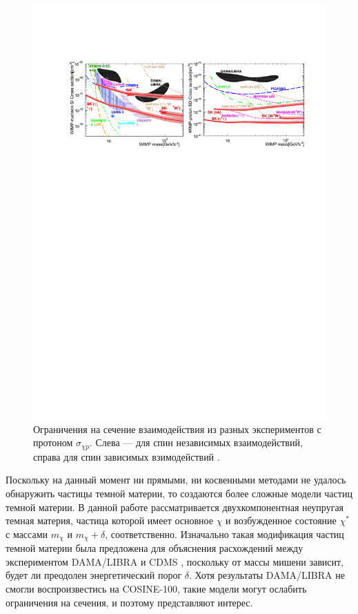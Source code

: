 \begin{figure}[htb]
	\begin{center}
		\includegraphics[scale=0.9]{images/SK_graphs.pdf}
		\caption{Ограничения на сечение взаимодействия из разных экспериментов с протоном $\sigma_{\chi p}$. Слева --- для спин независимых взаимодействий, справа для спин зависимых взимодействий \cite{kamiokandecollaboration2015search}.}
	\end{center}
\end{figure}

Поскольку на данный момент ни прямыми, ни косвенными методами не удалось обнаружить частицы темной материи, то создаются более сложные модели частиц темной материи.
В данной работе рассматривается двухкомпонентная неупругая темная материя, частица которой имеет основное $\chi$ и возбужденное состояние $\chi^*$ с массами $m_{\chi}$ и $m_{\chi}+\delta$, соответственно. Изначально такая модификация частиц темной материи была предложена для объяснения расхождений между экспериментом DAMA/LIBRA и CDMS \cite{PhysRevD.64.043502}, поскольку от массы мишени зависит, будет ли преодолен энергетический порог $\delta$. Хотя результаты DAMA/LIBRA не смогли воспроизвестись на COSINE-100, такие модели могут ослабить ограничения на сечения, и поэтому представляют интерес.

